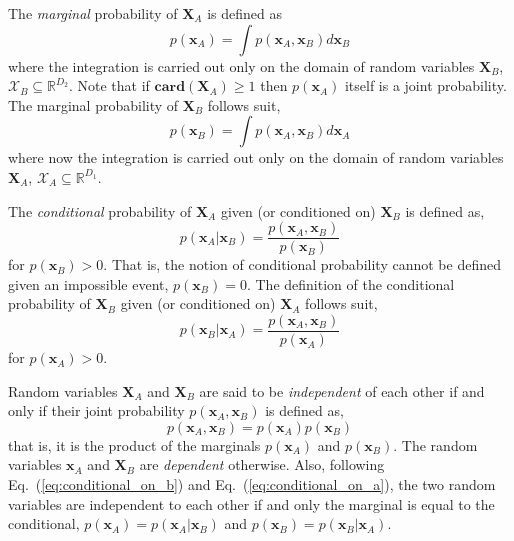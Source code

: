 The \emph{marginal} probability of $\mathbf{X}_A$ is defined as
\begin{equation}
  p(\mathbf{x}_A) = \int p(\mathbf{x}_A,\mathbf{x}_B) d\mathbf{x}_B
\label{eq:marginal_set_a}
\end{equation}
where the integration is carried out only on the domain of random variables $\mathbf{X}_B$, $\mathcal{X}_B \subseteq \mathbb{R}^{D_2}$. 
Note that if $\mathbf{card}(\mathbf{X}_A) \geq 1$ then $p(\mathbf{x}_A)$ itself is a joint probability.
The marginal probability of $\mathbf{X}_B$ follows suit,
\begin{equation}
  p(\mathbf{x}_B) = \int p(\mathbf{x}_A,\mathbf{x}_B) d\mathbf{x}_A
\label{eq:marginal_set_a}
\end{equation}
where now the integration is carried out only on the domain of random variables $\mathbf{X}_A$, $\mathcal{X}_A \subseteq \mathbb{R}^{D_1}$.

The \emph{conditional} probability of $\mathbf{X}_A$ given (or conditioned on) $\mathbf{X}_B$ is defined as,
\begin{equation}
  p(\mathbf{x}_A|\mathbf{x}_B) = \frac{p(\mathbf{x}_A, \mathbf{x}_B)}{p(\mathbf{x}_B)}
\label{eq:conditional_on_b}
\end{equation}
for $p(\mathbf{x}_B) > 0$. That is, the notion of conditional probability cannot be defined given an impossible event, $p(\mathbf{x}_B) = 0$. 
The definition of the conditional probability of $\mathbf{X}_B$ given (or conditioned on) $\mathbf{X}_A$ follows suit, 
\begin{equation}
  p(\mathbf{x}_B|\mathbf{x}_A) = \frac{p(\mathbf{x}_A, \mathbf{x}_B)}{p(\mathbf{x}_A)}
\label{eq:conditional_on_a}
\end{equation}
for $p(\mathbf{x}_A) > 0$.

Random variables $\mathbf{X}_A$ and $\mathbf{X}_B$ are said to be \emph{independent} of each
other if and only if their joint probability $p(\mathbf{x}_A, \mathbf{x}_B)$ is defined as,
\begin{equation}
  p(\mathbf{x}_A, \mathbf{x}_B) = p(\mathbf{x}_A) p(\mathbf{x}_B)
\label{eq:independence}
\end{equation}
that is, it is the product of the marginals $p(\mathbf{x}_A)$ and $p(\mathbf{x}_B)$.
The random variables $\mathbf{x}_A$ and $\mathbf{X}_B$ are \emph{dependent} otherwise.
Also, following Eq.~(\ref{eq:conditional_on_b}) and Eq.~(\ref{eq:conditional_on_a}), the two random variables are independent to each other if and only the marginal is equal to the conditional, $p(\mathbf{x}_A) = p(\mathbf{x}_A|\mathbf{x}_B)$ and $p(\mathbf{x}_B) = p(\mathbf{x}_B|\mathbf{x}_A)$.

